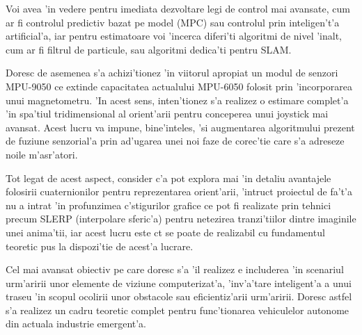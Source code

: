 \documentclass[12pt,a4paper,twoside]{report}
\begin{document}
\vspace{5px}

Voi avea 'in vedere pentru imediata dezvoltare legi de control mai avansate, cum ar fi controlul predictiv bazat pe model (MPC) sau controlul prin inteligen't'a artificial'a, iar pentru estimatoare voi 'incerca diferi'ti algoritmi de nivel 'inalt, cum ar fi filtrul de particule, sau algoritmi dedica'ti pentru SLAM.

\vspace{5px}

Doresc de asemenea s'a achizi'tionez 'in viitorul apropiat un modul de senzori MPU-9050 ce extinde capacitatea actualului MPU-6050 folosit prin 'incorporarea unui magnetometru. 'In acest sens, inten'tionez s'a realizez o estimare complet'a 'in spa'tiul tridimensional al orient'arii pentru conceperea unui joystick mai avansat. Acest lucru va impune, bine'inteles, 'si augmentarea algoritmului prezent de fuziune senzorial'a prin ad'ugarea unei noi faze de corec'tie care s'a adreseze noile m'asr'atori.

\vspace{5px}

Tot legat de acest aspect, consider c'a pot explora mai 'in detaliu avantajele folosirii cuaternionilor pentru reprezentarea orient'arii, 'intruc\ia t proiectul de fa't'a nu a intrat 'in profunzimea c\ia 'stigurilor grafice ce pot fi realizate prin tehnici precum SLERP (interpolare sferic'a) pentru netezirea tranzi'tiilor dintre imaginile unei anima'tii, iar acest lucru este c\ia t se poate de realizabil cu fundamentul teoretic pus la dispozi'tie de acest'a lucrare.

\vspace{5px}

Cel mai avansat obiectiv pe care doresc s'a 'il realizez e includerea 'in scenariul urm'aririi unor elemente de viziune computerizat'a, 'inv'a'tare inteligent'a a unui traseu 'in scopul ocolirii unor obstacole sau eficientiz'arii urm'aririi. Doresc astfel s'a realizez un cadru teoretic complet pentru func'tionarea vehiculelor autonome din actuala industrie emergent'a.

 


\end{document}
